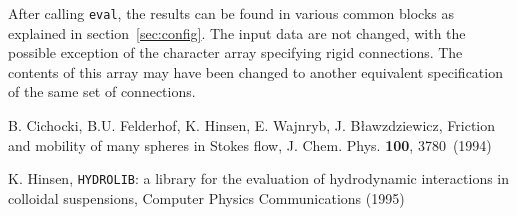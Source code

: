 \documentclass[12pt]{article}
\newcommand{\prog}[1]{{\tt #1}}
\newcommand{\name}[1]{{\sc #1}}
\newcommand{\vol}[1]{{\bf #1}}
\begin{document}
After calling \prog{eval}, the results can be found in various common
blocks as explained in section~\ref{sec:config}. The input data
are not changed, with the possible exception of the character array
specifying rigid connections. The contents of this array may have been
changed to another equivalent specification of the same set of
connections.


\begin{thebibliography}{9}

  \name{B. Cichocki, B.U. Felderhof, K. Hinsen,
        E. Wajnryb, J. B{\l}awzdziewicz},
  Friction and mobility of many spheres in Stokes flow,
  J. Chem. Phys. \vol{100}, 3780~(1994)

  \name{K. Hinsen},
  \prog{HYDROLIB}: a library for the evaluation of hydrodynamic
       interactions in colloidal suspensions,
  Computer Physics Communications (1995)

\end{thebibliography}
\end{document}
